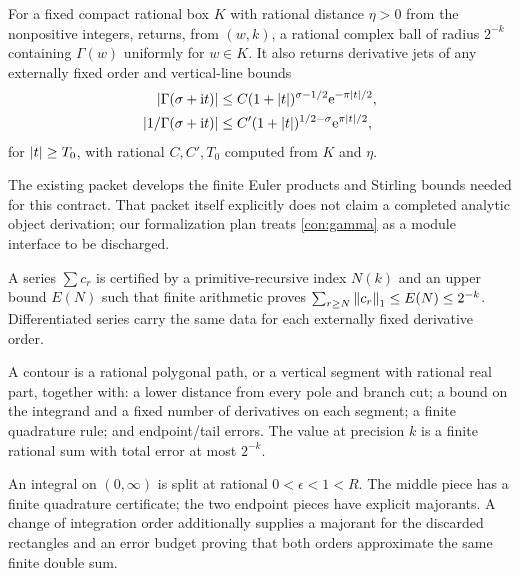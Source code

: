 \begin{contract}[Gamma]\label{con:gamma}
For a fixed compact rational box $K$ with rational distance $\eta>0$ from the
nonpositive integers,  returns, from $(w,k)$, a rational
complex ball of radius $2^{-k}$ containing $\Gamma(w)$ uniformly for $w\in K$.
It also returns derivative jets of any externally fixed order and vertical-line
bounds
\begin{align}
 \left|\Gamma(\sigma+\mathrm i t)\right|
 &\le C(1+\left|t\right|)^{\sigma-1/2}\mathrm e^{-\pi\left|t\right|/2},\label{eq:gamma-upper}\\
 \left|1/\Gamma(\sigma+\mathrm i t)\right|
 &\le C'(1+\left|t\right|)^{1/2-\sigma}\mathrm e^{\pi\left|t\right|/2},\label{eq:recip-gamma-upper}
\end{align}
for $\left|t\right|\ge T_0$, with rational $C,C',T_0$ computed from $K$ and $\eta$.
\end{contract}
The existing  packet develops the finite Euler products and
Stirling bounds needed for this contract.  That packet itself explicitly does
not claim a completed analytic object derivation; our formalization plan treats
\cref{con:gamma} as a module interface to be discharged.

\begin{contract}
A series $\sum c_r$ is certified by a primitive-recursive index $N(k)$ and an
upper bound $E(N)$ such that finite arithmetic proves
$\sum_{r\ge N}\left\lVert c_r\right\rVert_1\le E(N)\le2^{-k}$.  Differentiated series carry the
same data for each externally fixed derivative order.
\end{contract}

\begin{contract}
A contour is a rational polygonal path, or a vertical segment with rational
real part, together with: a lower distance from every pole and branch cut; a
bound on the integrand and a fixed number of derivatives on each segment; a
finite quadrature rule; and endpoint/tail errors.  The value at precision $k$
is a finite rational sum with total error at most $2^{-k}$.
\end{contract}

\begin{contract}
An integral on $(0,\infty)$ is split at rational $0<\epsilon<1<R$.  The middle
piece has a finite quadrature certificate; the two endpoint pieces have
explicit majorants.  A change of integration order additionally supplies a
majorant for the discarded rectangles and an error budget proving that both
orders approximate the same finite double sum.
\end{contract}

